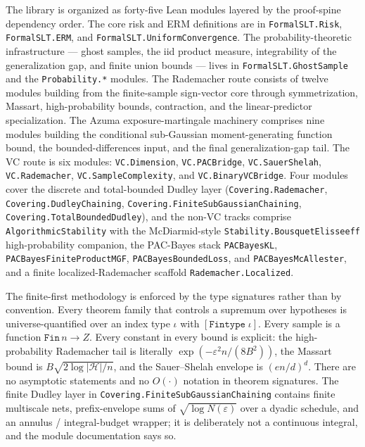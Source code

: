 \documentclass[sigplan,anonymous,review,screen]{acmart}
\newcommand{\Hyp}{\mathcal{H}}
\begin{document}
The library is organized as forty-five Lean modules layered by the
proof-spine dependency order. The core risk and ERM definitions are in
\texttt{FormalSLT.Risk}, \texttt{FormalSLT.ERM}, and
\texttt{FormalSLT.UniformConvergence}. The probability-theoretic
infrastructure --- ghost samples, the iid product measure, integrability
of the generalization gap, and finite union bounds --- lives in
\texttt{FormalSLT.GhostSample} and the \texttt{Probability.*} modules.
The Rademacher route consists of twelve modules building from the
finite-sample sign-vector core through symmetrization, Massart,
high-probability bounds, contraction, and the linear-predictor
specialization. The Azuma exposure-martingale machinery comprises nine
modules building the conditional sub-Gaussian moment-generating function
bound, the bounded-differences input, and the final
generalization-gap tail. The VC route is six modules:
\texttt{VC.Dimension}, \texttt{VC.PACBridge}, \texttt{VC.SauerShelah},
\texttt{VC.Rademacher}, \texttt{VC.SampleComplexity}, and
\texttt{VC.BinaryVCBridge}. Four modules cover the discrete and total-bounded
Dudley layer (\texttt{Covering.Rademacher},
\texttt{Covering.DudleyChaining},
\texttt{Covering.}\allowbreak\texttt{FiniteSubGaussianChaining},
\texttt{Covering.TotalBoundedDudley}), and the non-VC tracks comprise
\texttt{AlgorithmicStability} with the McDiarmid-style
\texttt{Stability.BousquetElisseeff} high-probability companion, the
PAC-Bayes stack \texttt{PACBayesKL}, \texttt{PACBayesFiniteProductMGF},
\texttt{PACBayesBoundedLoss}, and \texttt{PACBayesMcAllester}, and a finite
localized-Rademacher scaffold \texttt{Rademacher.Localized}.

The finite-first methodology is enforced by the type signatures rather
than by convention. Every theorem family that controls a supremum over
hypotheses is universe-quantified over an index type $\iota$ with
$[\texttt{Fintype}\;\iota]$. Every sample is a function
$\texttt{Fin}\,n \to Z$. Every constant in every bound is explicit:
the high-probability Rademacher tail is literally
$\exp(-\varepsilon^{2} n / (8 B^{2}))$, the Massart bound is
$B \sqrt{2 \log |\Hyp| / n}$, and the Sauer--Shelah envelope is
$(en/d)^d$. There are no asymptotic statements and no $O(\cdot)$
notation in theorem signatures. The finite Dudley layer in
\texttt{Covering.}\allowbreak\texttt{FiniteSubGaussianChaining} contains finite multiscale
nets, prefix-envelope sums of $\sqrt{\log N(\varepsilon)}$ over a
dyadic schedule, and an annulus / integral-budget wrapper; it is
deliberately not a continuous integral, and the module documentation
says so.
\end{document}
